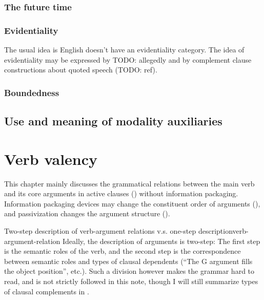 \documentclass[UTF8, a4paper, oneside, scheme=plain]{ctexrep}
\begin{document}
\subsection{The future time}\label{sec:future}

\subsection{Evidentiality}

The usual idea is English doesn't have an evidentiality category.
The idea of evidentiality may be expressed by TODO: allegedly 
and by complement clause constructions about quoted speech (TODO: ref).

\subsection{Boundedness}



\section{Use and meaning of modality auxiliaries}\label{sec:verb-inflection.modal-use}


\chapter{Verb valency}

This chapter mainly discusses the grammatical relations between the main verb and its core arguments 
in active clauses ()
without information packaging.
Information packaging devices may change the constituent order of arguments 
(),
and passivization changes the argument structure (). 

\begin{infobox}{Two-step description of verb-argument relations v.s. one-step description}{verb-argument-relation}
    Ideally, the description of arguments is two-step:
    The first step is the semantic roles of the verb,
    and the second step is the correspondence between semantic roles 
    and types of clausal dependents
    (``The G argument fills the object position'', etc.).
    Such a division however makes the grammar hard to read,
    and is not strictly followed in this note,
    though I will still summarize types of clausal complements in .
\end{infobox}
\end{document}
